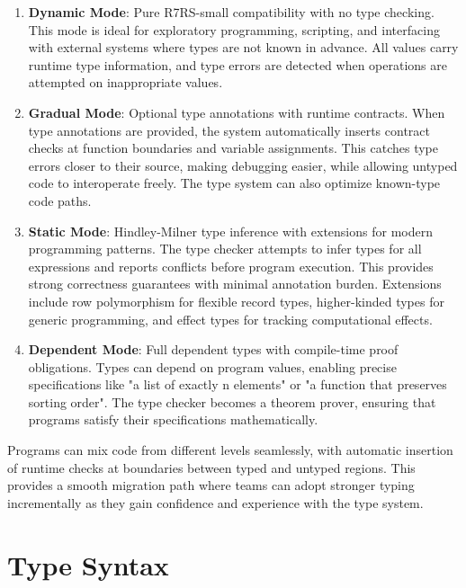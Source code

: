 \begin{enumerate}
\item \textbf{Dynamic Mode}: Pure R7RS-small compatibility with no type checking. This mode is ideal for exploratory programming, scripting, and interfacing with external systems where types are not known in advance. All values carry runtime type information, and type errors are detected when operations are attempted on inappropriate values.

\item \textbf{Gradual Mode}: Optional type annotations with runtime contracts. When type annotations are provided, the system automatically inserts contract checks at function boundaries and variable assignments. This catches type errors closer to their source, making debugging easier, while allowing untyped code to interoperate freely. The type system can also optimize known-type code paths.

\item \textbf{Static Mode}: Hindley-Milner type inference with extensions for modern programming patterns. The type checker attempts to infer types for all expressions and reports conflicts before program execution. This provides strong correctness guarantees with minimal annotation burden. Extensions include row polymorphism for flexible record types, higher-kinded types for generic programming, and effect types for tracking computational effects.

\item \textbf{Dependent Mode}: Full dependent types with compile-time proof obligations. Types can depend on program values, enabling precise specifications like "a list of exactly n elements" or "a function that preserves sorting order". The type checker becomes a theorem prover, ensuring that programs satisfy their specifications mathematically.
\end{enumerate}

Programs can mix code from different levels seamlessly, with automatic insertion of runtime checks at boundaries between typed and untyped regions. This provides a smooth migration path where teams can adopt stronger typing incrementally as they gain confidence and experience with the type system.

\section{Type Syntax}
\label{sec:type-syntax}


